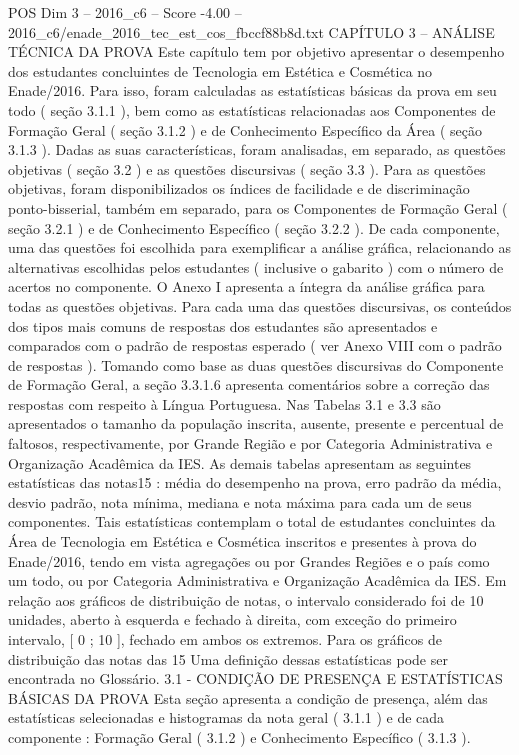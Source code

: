 \begin{textsample}{POS Dim 3 – 2016\_c6 – Score -4.00 – 2016\_c6/enade\_2016\_tec\_est\_cos\_fbccf88b8d.txt}  \label{ex:f3_pos_248}
CAPÍTULO 3 – ANÁLISE TÉCNICA DA PROVA Este capítulo tem por objetivo apresentar o desempenho dos estudantes concluintes de Tecnologia em Estética e Cosmética no Enade/2016.
Para isso, foram calculadas as estatísticas básicas da prova em seu todo ( seção 3.1.1 ), bem como as estatísticas relacionadas aos Componentes de Formação Geral ( seção 3.1.2 ) e de Conhecimento Específico da Área ( seção 3.1.3 ).
Dadas as suas características, foram analisadas, em separado, as questões objetivas ( seção 3.2 ) e as questões discursivas ( seção 3.3 ).
Para as questões objetivas, foram disponibilizados os índices de facilidade e de discriminação ponto-bisserial, também em separado, para os Componentes de Formação Geral ( seção 3.2.1 ) e de Conhecimento Específico ( seção 3.2.2 ).
De cada componente, uma das questões foi escolhida para exemplificar a análise gráfica, relacionando as alternativas escolhidas pelos estudantes ( inclusive o gabarito ) com o número de acertos no componente.
O Anexo I apresenta a íntegra da análise gráfica para todas as questões objetivas.
Para cada uma das questões discursivas, os conteúdos dos tipos mais comuns de respostas dos estudantes são apresentados e comparados com o padrão de respostas esperado ( ver Anexo VIII com o padrão de respostas ).
Tomando como base as duas questões discursivas do Componente de Formação Geral, a seção 3.3.1.6 apresenta comentários sobre a correção das respostas com respeito à Língua Portuguesa.
Nas Tabelas 3.1 e 3.3 são apresentados o tamanho da população inscrita, ausente, presente e percentual de faltosos, respectivamente, por Grande Região e por Categoria Administrativa e Organização Acadêmica da IES.
As demais tabelas apresentam as seguintes estatísticas das notas15 : média do desempenho na prova, erro padrão da média, desvio padrão, nota mínima, mediana e nota máxima para cada um de seus componentes.
Tais estatísticas contemplam o total de estudantes concluintes da Área de Tecnologia em Estética e Cosmética inscritos e presentes à prova do Enade/2016, tendo em vista agregações ou por Grandes Regiões e o país como um todo, ou por Categoria Administrativa e Organização Acadêmica da IES.
Em relação aos gráficos de distribuição de notas, o intervalo considerado foi de 10 unidades, aberto à esquerda e fechado à direita, com exceção do primeiro intervalo, [ 0 ; 10 ], fechado em ambos os extremos.
Para os gráficos de distribuição das notas das 15 Uma definição dessas estatísticas pode ser encontrada no Glossário. 3.1 - CONDIÇÃO DE PRESENÇA E ESTATÍSTICAS BÁSICAS DA PROVA Esta seção apresenta a condição de presença, além das estatísticas selecionadas e histogramas da nota geral ( 3.1.1 ) e de cada componente : Formação Geral ( 3.1.2 ) e Conhecimento Específico ( 3.1.3 ).

\end{textsample}
